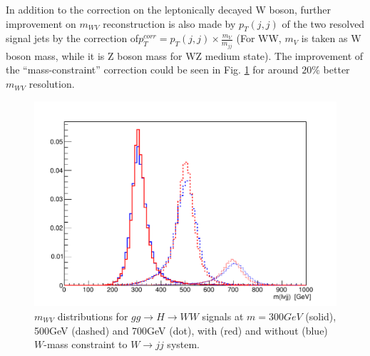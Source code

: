 \noindent
In addition to the correction on the leptonically decayed W boson, further improvement on $m_{WV}$ reconstruction is also made by $p_{T}(j,j)$ of the two resolved signal jets by the correction of$p_{T}^{corr}=p_{T}(j,j)\times \frac{m_{V}}{m_{jj}}$ (For WW, $m_V$ is taken as W boson mass, while it is Z boson mass for WZ medium state). The improvement of the ``mass-constraint'' correction could be seen in Fig. \ref{Fig:WHadmassConst} for around $20\%$ better $m_{WV}$ resolution. 
\begin{figure}[h]
	\centering
	\includegraphics[width=0.6\hsize]{Chapter3/lvjjmass_WmassConstraint}
	\caption{$m_{WV}$ distributions for $gg \rightarrow H \rightarrow WW$ signals at $m=300GeV$ (solid), 500GeV (dashed) and 700GeV (dot), with (red) and without (blue) $W$-mass constraint to $W \rightarrow jj$ system.}\label{Fig:WHadmassConst}
\end{figure}
\noindent
